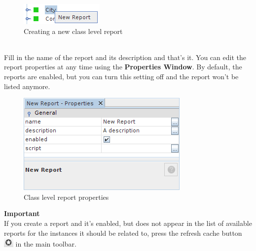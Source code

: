 \documentclass[a4paper]{article}
\begin{document}
			\begin{figure}[h!]
				\centering
				\includegraphics[scale=0.8]{img/reports_new_report.png}
				\caption{Creating a new class level report}
				\label{fig:reports_new_report}
			\end{figure}\\
			Fill in the name of the report and its description and that's it. You can edit the report properties at any time using the \textbf{Properties Window}. By default, the reports are enabled, but you can turn this setting off and the report won't be listed anymore.
			\begin{figure}[h!]
				\centering
				\includegraphics[scale=0.8]{img/reports_report_properties.png}
				\caption{Class level report properties}
				\label{fig:reports_report_properties}
			\end{figure}
			\begin{framed} {\large \textbf{Important}}\\
				If you create a report and it's enabled, but does not appear in the list of available reports for the instances it should be related to, press the refresh cache button \includegraphics[width=0.5cm]{img/icon_refresh_cache.png} in the main toolbar.
			\end{framed}
\end{document}
